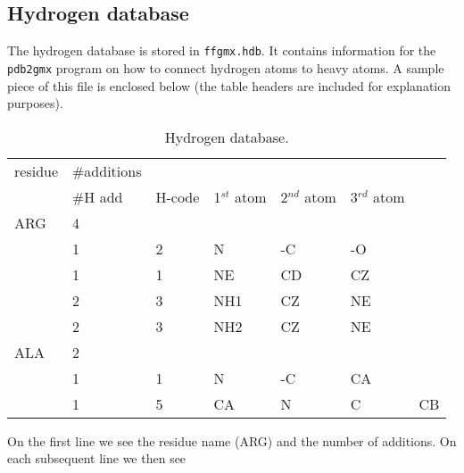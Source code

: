 \subsection{Hydrogen database}
The hydrogen database is stored in {\tt ffgmx.hdb}. It contains information
for the {\tt pdb2gmx} program on how to connect hydrogen atoms to
heavy atoms.
A sample piece of this file is enclosed below (the table headers are 
included for explanation purposes).
\begin{table}[ht]
\begin{tabular}{lllllll}
residue        & \#additions        &        &                &                &     
   \\
        & \#H add         & H-code& 1$^{st}$ atom        & 2$^{nd}$ atom        & 3$^
{rd}$ atom        \\
\hline
ARG     & 4	&	&  	&	&	&	\\
        & 1	& 2     & N     & -C	& -O	&     	\\
        & 1	& 1     & NE    & CD	& CZ	&    	\\
        & 2	& 3     & NH1   & CZ	& NE	&   	\\
        & 2	& 3     & NH2   & CZ	& NE	& 	\\
ALA 	& 2	& 	&	&	&	&	\\
	& 1	& 1	& N	& -C	& CA	&	\\
	& 1	& 5	& CA	& N	& C	& CB
\end{tabular}
\caption{Hydrogen database.}
\end{table}
On the first line we see the residue name (ARG) and the number of additions.
On each subsequent line we then see 
